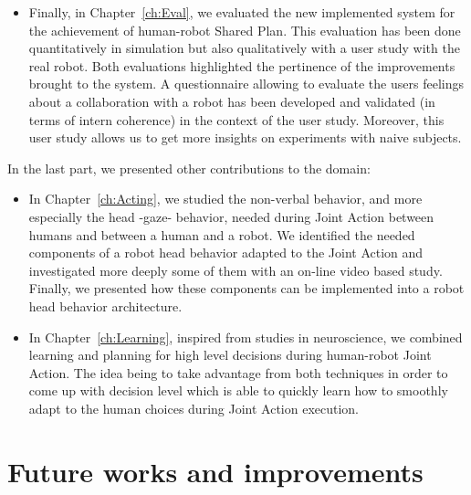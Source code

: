 \documentclass[english, a4paper,11pt,twoside]{StyleThese}
\begin{document}
\begin{itemize}
\begin{itemize}
\item Finally, in Chapter~\ref{ch:Eval}, we evaluated the new implemented system for the achievement of human-robot Shared Plan. This evaluation has been done quantitatively in simulation but also qualitatively with a user study with the real robot. Both evaluations highlighted the pertinence of the improvements brought to the system. A questionnaire allowing to evaluate the users feelings about a collaboration with a robot has been developed and validated (in terms of intern coherence) in the context of the user study. Moreover, this user study allows us to get more insights on experiments with naive subjects.
\end{itemize} 
In the last part, we presented other contributions to the domain:
\begin{itemize}
\item In Chapter~\ref{ch:Acting}, we studied the non-verbal behavior, and more especially the head -gaze- behavior, needed during Joint Action between humans and between a human and a robot. We identified the needed components of a robot head behavior adapted to the Joint Action and investigated more deeply some of them with an on-line video based study. Finally, we presented how these components can be implemented into a robot head behavior architecture.
\item In Chapter~\ref{ch:Learning}, inspired from studies in neuroscience, we combined learning and planning for high level decisions during human-robot Joint Action. The idea being to take advantage from both techniques in order to come up with decision level which is able to quickly learn how to smoothly adapt to the human choices during Joint Action execution.
\end{itemize}
\end{itemize}

\section*{Future works and improvements}
\end{document}
